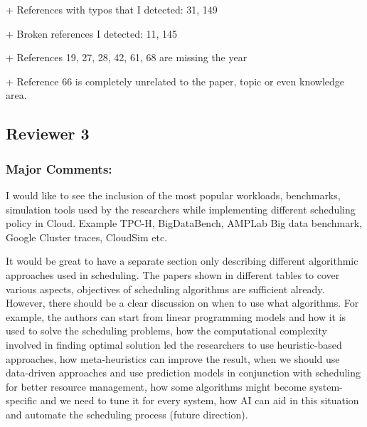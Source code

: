 
+ References with typos that I detected: 31, 149


+ Broken references I detected: 11, 145


+ References 19, 27, 28, 42, 61, 68 are missing the year



+ Reference 66 is completely unrelated to the paper, topic or even knowledge area.



\subsection{Reviewer 3}

\subsubsection{Major Comments:}

I would like to see the inclusion of the most popular workloads, benchmarks, simulation tools used by the researchers while implementing different scheduling policy in Cloud. Example TPC-H, BigDataBench, AMPLab Big data benchmark, Google Cluster traces, CloudSim etc.


It would be great to have a separate section only describing different algorithmic approaches used in scheduling. The papers shown in different tables to cover various aspects, objectives of scheduling algorithms are sufficient already. However, there should be a clear discussion on when to use what algorithms. For example, the authors can start from linear programming models and how it is used to solve the scheduling problems, how the computational complexity involved in finding optimal solution led the researchers to use heuristic-based approaches, how meta-heuristics can improve the result, when we should use data-driven approaches and use prediction models in conjunction with scheduling for better resource management, how some algorithms might become system-specific and we need to tune it for every system, how AI can aid in this situation and automate the scheduling process (future direction).

